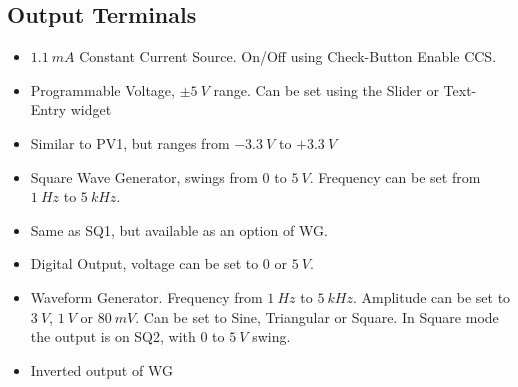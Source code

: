 \documentclass[a4paper,12pt,english]{sphinxmanual}
\let\sphinxpxdimen\pdfpxdimen\else\newdimen\sphinxpxdimen
\begin{document}
\subsection{Output Terminals}
\label{\detokenize{3.1:output-terminals}}\begin{itemize}
\item {} 
 \(1.1\ mA\) Constant Current Source. On/Off using Check-Button
Enable CCS.

\item {} 
 Programmable Voltage, \(\pm 5\ V\) range. Can be set using the
Slider or Text-Entry widget

\item {} 
 Similar to PV1, but ranges from \(- 3.3\ V\) to \(+ 3.3\ V\)

\item {} 
 Square Wave Generator, swings from \(0\) to \(5\ V\).
Frequency can be set from \(1\ Hz\) to \(5\ kHz\).

\item {} 
 Same as SQ1, but available as an option of WG.

\item {} 
 Digital Output, voltage can be set to \(0\) or \(5\ V\).

\item {} 
 Waveform Generator. Frequency from \(1\ Hz\) to \(5\ kHz\).
Amplitude can be set to \(3\ V\), \(1\ V\) or \(80\ mV\).
Can be set to Sine, Triangular or Square.
In Square mode the output is on SQ2, with \(0\) to \(5\ V\) swing.

\item {} 
 Inverted output of WG

\end{itemize}

\begin{figure}[htbp]
\centering

\noindent\sphinxincludegraphics[width=300\sphinxpxdimen]{{scope-inputs}.pdf}
\end{figure}
\end{document}
